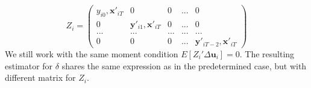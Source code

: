 \documentclass[12pt]{article}
\theoremstyle{definition}
\theoremstyle{property}
\theoremstyle{assumption}
\theoremstyle{example}
\theoremstyle{comment}
\begin{document}
\begin{itemize}
\[
Z_i = \begin{pmatrix}y_{i0}, \mathbf{x}'_{iT}& 0 &0 &...& 0\\ 0 & \mathbf{y}'_{i1},\mathbf{x}'_{iT}& 0 & ... & 0 \\ ...&...&...&...&...\\ 0 & 0& 0& ... & \mathbf{y}'_{iT-2},\mathbf{x}'_{iT}\end{pmatrix}
\]
We still work with the same moment condition $E[Z_i'\Delta \mathbf{u}_i]=0$. The resulting estimator for $\delta$ shares the same expression as in the predetermined case, but with different matrix for $Z_i$. 
\end{itemize}

\end{document}
